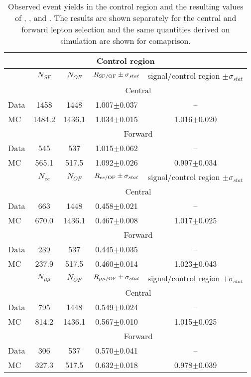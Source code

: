 
\begin{table}[hbtp]
 \renewcommand{\arraystretch}{1.3}
 \setlength{\belowcaptionskip}{6pt}
 \centering
 \caption{Observed event yields in the control region and the resulting values of \Rsfof, \Reeof, and \Rmmof. The results are shown separately for the central and forward lepton selection and the same quantities derived on simulation are shown for comaprison.}
  \label{tab:rSFOF}
\begin{tabular}{l|c|c|c|c}
\multicolumn{5}{c}{Control region}\\ \hline     
 & $N_{SF}$ & $N_{OF}$ & $ R_{\text{SF/OF}} \pm \sigma_{stat}$ & signal/control region $\pm \sigma_{stat}$  \\    
\hline
&  \multicolumn{4}{c}{Central} \\
\hline
 Data & 1458 & 1448 & 1.007$\pm$0.037 & -- \\
 MC & 1484.2 & 1436.1 & 1.034$\pm$0.015 & 1.016$\pm$0.020\\
 
 
    \hline 
& \multicolumn{4}{c}{Forward} \\
\hline
 Data & 545 & 537 & 1.015$\pm$0.062 & -- \\
 MC & 565.1 & 517.5 & 1.092$\pm$0.026 & 0.997$\pm$0.034\\

\hline\hline
 & $N_{ee}$ & $N_{OF}$ & $ R_\text{$ee$/OF} \pm \sigma_{stat}$ & signal/control region $\pm \sigma_{stat}$  \\    
\hline
&  \multicolumn{4}{c}{Central} \\
\hline
 Data & 663 & 1448 & 0.458$\pm$0.021 & -- \\
 MC & 670.0 & 1436.1 & 0.467$\pm$0.008 & 1.017$\pm$0.025\\
 
 
    \hline 
& \multicolumn{4}{c}{Forward} \\
\hline
 Data & 239 & 537 & 0.445$\pm$0.035 & -- \\
 MC & 237.9 & 517.5 & 0.460$\pm$0.014 & 1.023$\pm$0.043\\

\hline\hline
 & $N_{\mu\mu}$ & $N_{OF}$ & $ R_\text{$\mu\mu$/OF} \pm \sigma_{stat}$ & signal/control region $\pm \sigma_{stat}$  \\    
\hline
& \multicolumn{4}{c}{Central} \\
\hline
 Data & 795 & 1448 & 0.549$\pm$0.024 & -- \\
 MC & 814.2 & 1436.1 & 0.567$\pm$0.010 & 1.015$\pm$0.025\\
 
 
    \hline 
 & \multicolumn{4}{c}{Forward} \\
\hline
 Data & 306 & 537 & 0.570$\pm$0.041 & -- \\
 MC & 327.3 & 517.5 & 0.632$\pm$0.018 & 0.978$\pm$0.039\\

  
\end{tabular}  
\end{table}
